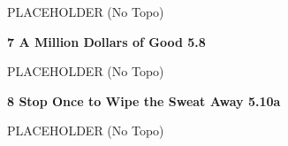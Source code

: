 \begin{multicols}{2}
					\begin{adjustwidth}{0.5cm}{}				
					PLACEHOLDER
						\newline (No Topo) 
					\end{adjustwidth}
					\label{rt:A Million Dollars of Good}
\colorbox{green!20}{
\parbox{0.95\linewidth}{
\textbf{
7 A Million Dollars of Good 5.8  
}
}
}

					\begin{adjustwidth}{0.5cm}{}				
					PLACEHOLDER
						\newline (No Topo) 
					\end{adjustwidth}
					\label{rt:Stop Once to Wipe the Sweat Away}
\colorbox{RoyalBlue!20}{
\parbox{0.95\linewidth}{
\textbf{
8 Stop Once to Wipe the Sweat Away 5.10a  
}
}
}

					\begin{adjustwidth}{0.5cm}{}				
					PLACEHOLDER
						\newline (No Topo) 
					\end{adjustwidth}
\end{multicols}
\clearpage